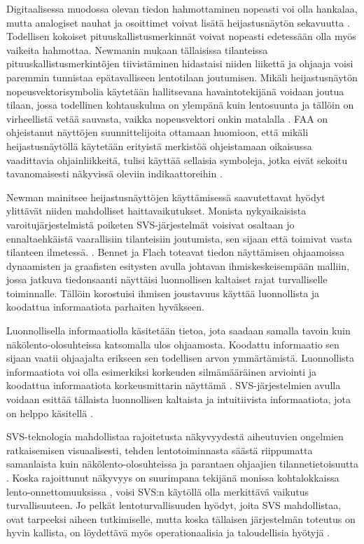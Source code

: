 \documentclass[utf8,bachelor,manualbib]{gradu3}
\begin{document}
Digitaalisessa muodossa olevan tiedon hahmottaminen nopeasti voi olla hankalaa, mutta analogiset nauhat ja osoittimet voivat lisätä heijastusnäytön sekavuutta \citeyearpar{zuschlag2003}. Todellisen kokoiset pituuskallistusmerkinnät voivat nopeasti edetessään olla myös vaikeita hahmottaa. Newmanin \citeyearpar{newman1995} mukaan tällaisissa tilanteissa pituuskallistusmerkintöjen tiivistäminen hidastaisi niiden liikettä ja ohjaaja voisi paremmin tunnistaa epätavalliseen lentotilaan joutumisen. Mikäli heijastusnäytön nopeusvektorisymbolia käytetään hallitsevana havaintotekijänä voidaan joutua tilaan, jossa todellinen kohtauskulma on ylempänä kuin lentosuunta ja tällöin on virheellistä vetää sauvasta, vaikka nopeusvektori onkin matalalla \citep{crawfordneal2006}. FAA on ohjeistanut näyttöjen suunnittelijoita ottamaan huomioon, että mikäli heijastusnäytöllä käytetään erityistä merkistöä ohjeistamaan oikaisussa vaadittavia ohjainliikkeitä, tulisi käyttää sellaisia symboleja, jotka eivät sekoitu tavanomaisesti näkyvissä oleviin indikaattoreihin \citep{crawfordneal2006}.

Newman \citeyearpar{newman2000} mainitsee heijastusnäyttöjen käyttämisessä saavutettavat hyödyt ylittävät niiden mahdolliset haittavaikutukset. Monista nykyaikaisista varoitujärjestelmistä poiketen SVS-järjestelmät voisivat osaltaan jo ennaltaehkäistä vaarallisiin tilanteisiin joutumista, sen sijaan että toimivat vasta tilanteen ilmetessä. \citep{schnellym2004}. Bennet ja Flach \citeyearpar{bennetflach1994} toteavat tiedon näyttämisen ohjaamoissa dynaamisten ja graafisten esitysten avulla johtavan ihmiskeskeisempään malliin, jossa jatkuva tiedonsaanti näyttäisi luonnollisen kaltaiset rajat turvalliselle toiminnalle. Tällöin korostuisi ihmisen joustavuus käyttää luonnollista ja koodattua informaatiota parhaiten hyväkseen.

Luonnollisella informaatiolla käsitetään tietoa, jota saadaan samalla tavoin kuin näkölento-olosuhteissa katsomalla ulos ohjaamosta. Koodattu informaatio sen sijaan vaatii ohjaajalta erikseen sen todellisen arvon ymmärtämistä. Luonnollista informaatiota voi olla esimerkiksi korkeuden silmämääräinen arviointi ja koodattua informaatiota korkeusmittarin näyttämä \citep{prinzelym2004}. SVS-järjestelmien avulla voidaan esittää tällaista luonnollisen kaltaista ja intuitiivista informaatiota, jota on helppo käsitellä \citep{wickensandre1990}.

SVS-teknologia mahdollistaa rajoitetusta näkyvyydestä aiheutuvien ongelmien ratkaisemisen visuaalisesti, tehden lentotoiminnasta säästä riippumatta samanlaista kuin näkölento-olosuhteissa ja parantaen ohjaajien tilannetietoisuutta \citep{prinzelym2004}. Koska rajoittunut näkyvyys on suurimpana tekijänä monissa kohtalokkaissa lento-onnettomuuksissa \citep{boeing1996}, voisi SVS:n käytöllä olla merkittävä vaikutus turvallisuuteen. Jo pelkät lentoturvallisuuden hyödyt, joita SVS mahdollistaa, ovat tarpeeksi aiheen tutkimiselle, mutta koska tällaisen järjestelmän toteutus on hyvin kallista, on löydettävä myös operationaalisia ja taloudellisia hyötyjä \citep{prinzelym2004}.
\end{document}
